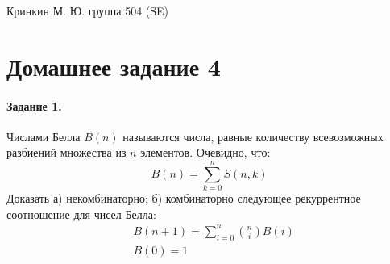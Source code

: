 \documentclass[a4paper,12pt]{article}
\begin{document}
\sloppy

\lstset{
	basicstyle=\small,
	stringstyle=\ttfamily,
	showstringspaces=false,
	columns=fixed,
	breaklines=true,
	numbers=right,
	numberstyle=\tiny
}

\newtheorem{Def}{Определение}[section]
\newtheorem{Th}{Теорема}
\newtheorem{Lem}[Th]{Лемма}
\newenvironment{Proof}
	{\par\noindent{\bf Доказательство.}}
	{\hfill$\scriptstyle\blacksquare$}
\newenvironment{Solution}
	{\par\noindent{\bf Решение.}}
	{\hfill$\scriptstyle\blacksquare$}


\begin{flushright}
	Кринкин М. Ю. группа 504 (SE)
\end{flushright}

\section{Домашнее задание 4}

\paragraph{Задание 1.} Числами Белла $B\left(n\right)$ называются числа, равные количеству всевозможных разбиений множества из $n$ элементов. Очевидно, что:
\[
	B\left(n\right) = \sum_{k=0}^{n} S\left(n,k\right)
\]
Доказать а) некомбинаторно; б) комбинаторно следующее рекуррентное соотношение для чисел Белла:
\[
	\begin{split}
		& B\left(n+1\right) = \sum_{i=0}^{n} \binom{n}{i} B\left(i\right) \\
		& B\left(0\right) = 1
	\end{split}
\]
\end{document}
